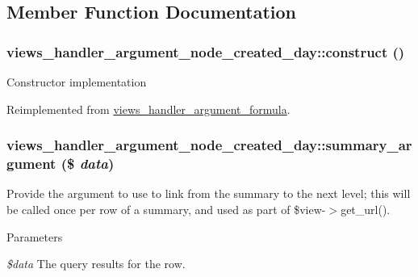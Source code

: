 \subsection{Member Function Documentation}
\hypertarget{classviews__handler__argument__node__created__day_aeb33813a3cc0da642e45a12625da5bde}{
\subsubsection[{construct}]{\setlength{\rightskip}{0pt plus 5cm}views\_\-handler\_\-argument\_\-node\_\-created\_\-day::construct ()}}
\label{classviews__handler__argument__node__created__day_aeb33813a3cc0da642e45a12625da5bde}
Constructor implementation 

Reimplemented from \hyperlink{classviews__handler__argument__formula_a01284402427de2bcfa1b1da5792a2332}{views\_\-handler\_\-argument\_\-formula}.\hypertarget{classviews__handler__argument__node__created__day_ac7f626914f87a04112962bf39d49d454}{
\subsubsection[{summary\_\-argument}]{\setlength{\rightskip}{0pt plus 5cm}views\_\-handler\_\-argument\_\-node\_\-created\_\-day::summary\_\-argument (\$ {\em data})}}
\label{classviews__handler__argument__node__created__day_ac7f626914f87a04112962bf39d49d454}
Provide the argument to use to link from the summary to the next level; this will be called once per row of a summary, and used as part of \$view-\/$>$get\_\-url().


\begin{DoxyParams}{Parameters}
\item[{\em \$data}]The query results for the row. \end{DoxyParams}


